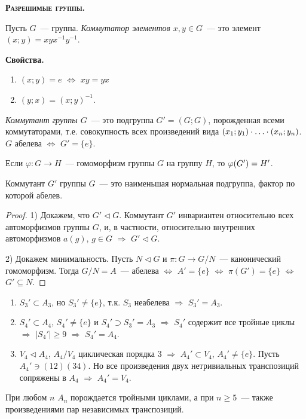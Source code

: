 \documentclass[a4paper]{article}
\newcommand*{\tema}[1]{\vspace{20pt}
\begin{center}{\textbf{\textsc{#1.}}}\vspace{5pt}
\end{center}}
\newcommand{\svoy}{\vspace{5pt}\noindent\textbf{Свойства.}\vspace{-6pt}}
\newcommand*{\p}[1]{#1\nobreak\discretionary{}{\hbox{$\mathsurround=0pt #1$}}{}}
\begin{document}
\tema{Разрешимые группы}

Пусть $G$~--- группа. \emph{Коммутатор элементов $x,y\in G$}~--- это
элемент $(x;y)=xyx^{-1}y^{-1}$.

\svoy
\begin{enumerate}
  \item $(x;y)=e$ $\Leftrightarrow$ $xy=yx$
  \item $(y;x)=(x;y)^{-1}$.
\end{enumerate}

\emph{Коммутант группы $G$}~--- это подгруппа $G'=(G;G)$,
порожденная всеми коммутаторами, т.е. совокупность всех произведений
вида $(x_1;y_1)\p\cdot\ldots\cdot(x_n;y_n)$. $G$ абелева
$\Leftrightarrow$ $G'=\{e\}$.

Если $\varphi\colon G\to H$~--- гомоморфизм группы $G$ на группу
$H$, то $\varphi(G')\p=H'$.

\begin{theorem}
\label{1.IX}Коммутант $G'$ группы $G$~--- это наименьшая нормальная
подгруппа, фактор по которой абелев.
\end{theorem}

\begin{proof}
1) Докажем, что $G'\triangleleft G$. Коммутант $G'$ инвариантен
относительно всех автоморфизмов группы $G$, и, в частности,
относительно внутренних автоморфизмов $a(g)$, $g\in G$ $\Rightarrow$
$G'\triangleleft G$.

2) Докажем минимальность. Пусть $N\triangleleft G$ и $\pi\colon G\to
G/N$~--- канонический гомоморфизм. Тогда $G/N=A$~--- абелева
$\Leftrightarrow$ $A'=\{e\}$ $\Leftrightarrow$ $\pi(G')=\{e\}$
$\Leftrightarrow$ $G'\subseteq N$.
\end{proof}

\prim
\begin{enumerate}
  \item $S_3'\subset A_3$, но $S_3'\neq\{e\}$, т.к. $S_3$ неабелева
  $\Rightarrow$ $S_3'=A_3$.
  \item $S_4'\subset A_4$, $S_4'\neq\{e\}$ и $S_4'\supset S_3'=A_3$
  $\Rightarrow$ $S_4'$ содержит все тройные циклы $\Rightarrow$ $|S_4'|\geqslant
  9$ $\Rightarrow$ $S_4'=A_4$.
  \item $V_4\triangleleft A_4$, $A_4/V_4$ циклическая порядка 3
  $\Rightarrow$ $A_4'\subset V_4$, $A_4'\neq\{e\}$. Пусть $A_4'\ni
  (12)(34)$. Но все произведения двух нетривиальных транспозиций
  сопряжены в $A_4$ $\Rightarrow$ $A_4'=V_4$.
\end{enumerate}

\begin{lemm}
При любом $n$ $A_n$ порождается тройными циклами, а при $n\geqslant
5$~--- также произведениями пар независимых транспозиций.
\end{lemm}
\end{document}

